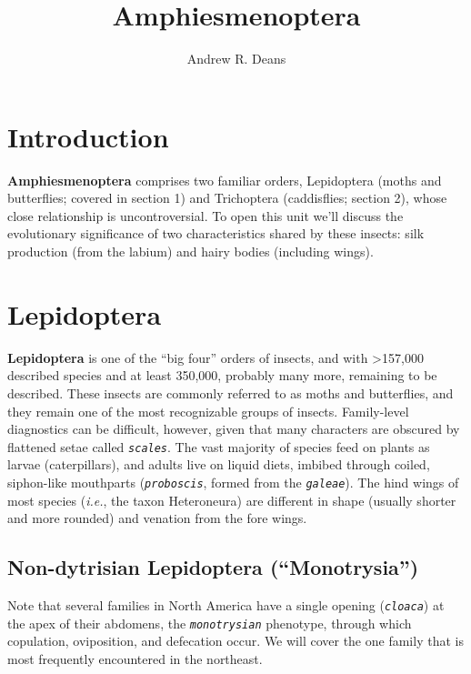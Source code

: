 \documentclass[letterpaper, 11pt]{article}
\title{Amphiesmenoptera}
\author{Andrew R. Deans}
\newcommand{\latinword}[1]{\texttt{\itshape #1}}%
\begin{document}
\cleanlookdateon %
\maketitle
\thispagestyle{fancy}

\section*{Introduction}
\textbf{Amphiesmenoptera} comprises two familiar orders, Lepidoptera (moths and butterflies; covered in section 1) and Trichoptera (caddisflies; section 2), whose close relationship is uncontroversial. To open this unit we'll discuss the evolutionary significance of two characteristics shared by these insects: silk production (from the labium) and hairy bodies (including wings).



\section{Lepidoptera}

\noindent{}\textbf{Lepidoptera} is one of the ``big four'' orders of insects, and with \textgreater157,000 described species \citep{van2011order} and at least 350,000, probably many more, remaining to be described. These insects are commonly referred to as moths and butterflies, and they remain one of the most recognizable groups of insects. Family-level diagnostics can be difficult, however, given that many characters are obscured by flattened setae called \latinword{scales}. The vast majority of species feed on plants as larvae (caterpillars), and adults live on liquid diets, imbibed through coiled, siphon-like mouthparts (\latinword{proboscis}, formed from the \latinword{galeae}). The hind wings of most species (\textit{i.e.}, the taxon Heteroneura) are different in shape (usually shorter and more rounded) and venation from the fore wings.

\subsection{Non-dytrisian Lepidoptera (``Monotrysia'')}
Note that several families in North America have a single opening (\latinword{cloaca}) at the apex of their abdomens, the \latinword{monotrysian} phenotype, through which copulation, oviposition, and defecation occur. We will cover the one family that is most frequently encountered in the northeast.
\end{document}
